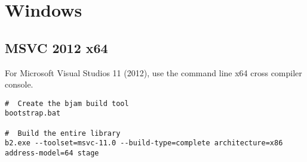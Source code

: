 \documentclass[12pt]{report}
\begin{document}
\section*{Windows}

\subsection*{MSVC 2012 x64}
For Microsoft Visual Studios 11 (2012), use the command line x64 cross
compiler console.

\begin{verbatim}
#  Create the bjam build tool
bootstrap.bat

#  Build the entire library
b2.exe --toolset=msvc-11.0 --build-type=complete architecture=x86 address-model=64 stage
\end{verbatim}
\end{document}
